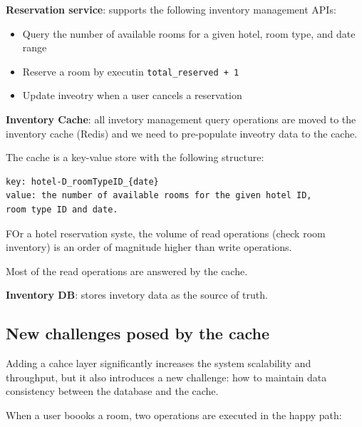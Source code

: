 \documentclass{report}
\theoremstyle{definition}
\let\oldsubsection\subsection
\renewcommand{\subsection}{\oldsubsection*}
\begin{document}
\textbf{Reservation service}: supports the following inventory management APIs:

\begin{itemize}
\item
Query the number of available rooms for a given hotel, room type, and date range
\item
Reserve a room by executin \lstinline|total_reserved + 1|
\item
Update inveotry when a user cancels a reservation
\end{itemize}

\textbf{Inventory Cache}: all invetory management query operations are moved to the inventory cache (Redis) and we need to pre-populate inveotry data to the cache.

The cache is a key-value store with the following structure:

\begin{lstlisting}
key: hotel-D_roomTypeID_{date}
value: the number of available rooms for the given hotel ID,
room type ID and date.
\end{lstlisting}

FOr a hotel reservation syste, the volume of read operations (check room inventory) is an order of magnitude higher than write operations.

Most of the read operations are answered by the cache.

\textbf{Inventory DB}: stores invetory data as the source of truth.

\subsection{New challenges posed by the cache}

Adding a cahce layer significantly increases the system scalability and throughput, but it also introduces a new challenge: how to maintain data consistency between the database and the cache.

When a user boooks a room, two operations are executed in the happy path:
\end{document}
